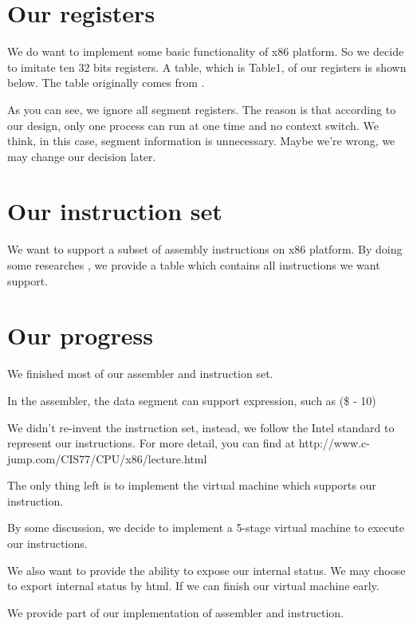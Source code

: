 \documentclass[12pt]{extarticle}
\begin{document}
\section{Our registers}
We do want to implement some basic functionality of x86 platform. So we decide to imitate ten 32 bits registers. A table, which is Table1, of our registers is shown below.
The table originally comes from \cite{kusswurm2014modern}.

As you can see, we ignore all segment registers. The reason is that according to our design, only one process can run at one time and no context switch.
We think, in this case, segment information is unnecessary. Maybe we're wrong, we may change our decision later.  
\section{Our instruction set}
We want to support a subset of assembly instructions on x86 platform. 
By doing some researches \cite{kusswurm2014modern}, we provide a table which contains all instructions we want support.

\section{Our progress}
We finished most of our assembler and instruction set. 

In the assembler, the data segment can support expression, such as (\$ - 10)

We didn't re-invent the instruction set, instead, we follow the Intel standard to represent our instructions. For more detail, you can find at http://www.c-jump.com/CIS77/CPU/x86/lecture.html

The only thing left is to implement the virtual machine which supports our instruction. 

By some discussion, we decide to implement a 5-stage virtual machine to execute our instructions.

We also want to provide the ability to expose our internal status. We may choose to export internal status by html. If we can finish our virtual machine early.

We provide part of our implementation of assembler and instruction.
\end{document}
